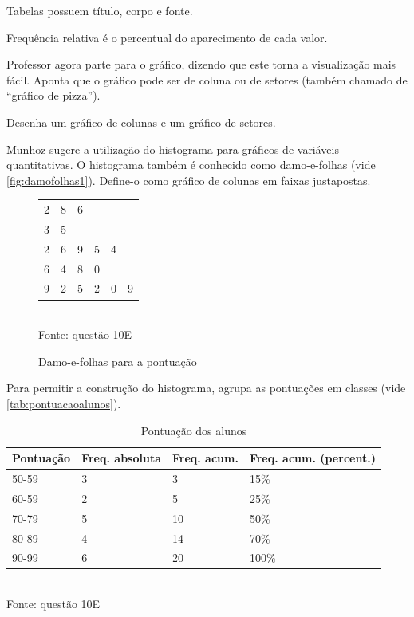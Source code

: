 \documentclass[a4paper]{article}
\begin{document}
	Tabelas possuem título, corpo e fonte.
	
	Frequência relativa é o percentual do aparecimento de cada valor.
	
	Professor agora parte para o gráfico, dizendo que este torna a visualização mais fácil. Aponta que o gráfico pode ser de coluna ou de setores (também chamado de ``gráfico de pizza'').
	
	Desenha um gráfico de colunas e um gráfico de setores.
	
	Munhoz sugere a utilização do histograma para gráficos de variáveis quantitativas. O histograma também é conhecido como damo-e-folhas (vide \autoref{fig:damofolhas1}). Define-o como gráfico de colunas em faixas justapostas.
	
	\begin{figure}[]
		\centering
		\caption{Damo-e-folhas para a pontuação}
		\begin{tabular}{l|lllll}
			2 & 8 & 6 &  &  &  \\
			3 & 5 &  &  &  &  \\
			2 & 6 & 9 & 5 & 4 &  \\
			6 & 4 & 8 & 0 &  &  \\
			9 & 2 & 5 & 2 & 0 & 9
		\end{tabular}
		\\ \vspace{1mm} Fonte: questão 10E
		\label{fig:damofolhas1}
	\end{figure}
	
	Para permitir a construção do histograma, agrupa as pontuações em classes (vide \autoref{tab:pontuacaoalunos}).
	
	\begin{table}[h]
		\centering
		\caption{Pontuação dos alunos}
		\begin{tabular}{l|l|l|l}
			\textbf{Pontuação} & \textbf{Freq. absoluta} & \textbf{Freq. acum.} & \textbf{Freq. acum. (percent.)} \\ \hline
			50-59 & 3 & 3 & 15\% \\
			60-59 & 2 & 5 & 25\% \\
			70-79 & 5 & 10 & 50\% \\
			80-89 & 4 & 14 & 70\% \\
			90-99 & 6 & 20 & 100\%
		\end{tabular}
		\\ \vspace{1mm} Fonte: questão 10E
		\label{tab:pontuacaoalunos}
	\end{table}
	
\end{document}
